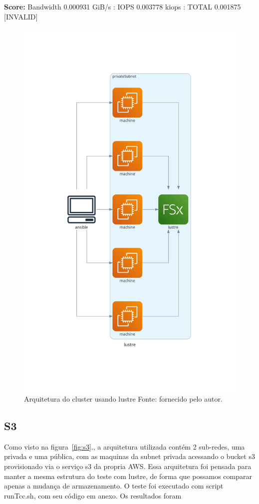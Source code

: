 \documentclass[article,a4paper,12pt,brazil,sumario=tradicional]{abntex2}
\begin{document}
\textbf{Score:} Bandwidth 0.000931 GiB/s : IOPS 0.003778 kiops : TOTAL 0.001875 [INVALID]


\begin{figure}[htb]
	\centering
	\includegraphics[width=1\textwidth]{lustre.png}
	\caption{Arquitetura do cluster usando lustre Fonte: fornecido pelo autor.}
	\label{fig:lustre}
\end{figure}

\subsection{S3}
Como visto na figura~\ref{fig:s3}., a arquitetura utilizada contém 2 sub-redes, uma privada e uma pública, com as maquinas da subnet privada acessando o bucket s3 provisionado via o serviço s3 da propria AWS. Essa arquitetura foi pensada para manter a mesma estrutura do teste com lustre, de forma que possamos comparar apenas a mudança de armazenamento. O teste foi executado com script runTcc.sh, com seu código em anexo. Os resultados foram
\end{document}

